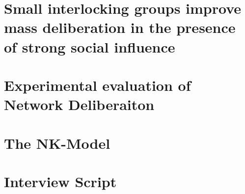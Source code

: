 \documentclass{report}
\newcommand{\+}{\phantom{-}}
\begin{document}
\chapter{Small interlocking groups improve mass deliberation in the presence
of strong social influence}
\label{chap:abm}
%

\chapter{Experimental evaluation of Network Deliberaiton}
\label{chap:experiment}


%


\begin{appendices}

\chapter{The NK-Model}
\label{apx:nk}


\chapter{Interview Script}
\label{apx:interview}


\end{appendices}

\nocite{*}


\end{document}
